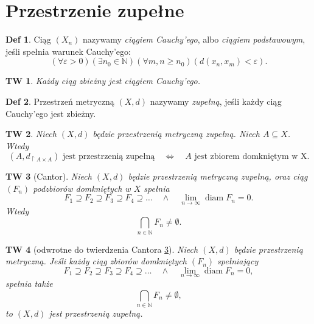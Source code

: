 \documentclass[a4paper, 12pt]{mwart}
\DeclareMathOperator{\diam}{diam}
\theoremstyle{definition}
\newtheorem{definicja}{Def}[section]
\theoremstyle{plain}
\newtheorem{twierdzenie}{TW}[section]
\theoremstyle{remark}
\begin{document}
\section{Przestrzenie zupełne}
\begin{definicja}
	Ciąg $(X_n)$ nazywamy \emph {ciągiem Cauchy'ego}, albo \emph{ciągiem podstawowym}, jeśli spełnia warunek Cauchy'ego:
	\begin{equation}
		\left(\forall \varepsilon > 0\right)\left(\exists n_0 \in \mathbb{N}\right)\left(\forall m, n \geq n_0\right)\left(d(x_n, x_m) < \varepsilon\right).
	\end{equation}
\end{definicja}
\begin{twierdzenie}
	Każdy ciąg zbieżny jest ciągiem Cauchy'ego.
\end{twierdzenie}
\begin{definicja}
	Przestrzeń metryczną $(X, d)$ nazywamy \emph{zupełną}, jeśli każdy ciąg Cauchy'ego jest zbieżny.
\end{definicja}
\begin{twierdzenie}
	Niech $(X, d)$ będzie przestrzenią metryczną zupełną. Niech $A \subseteq X$. Wtedy
	\begin{equation}
		(A, d_{\restriction A\times A}) \text{ jest przestrzenią zupełną} \quad \iff \quad A \text{ jest zbiorem domkniętym w X}.
	\end{equation}
\end{twierdzenie}
\begin{twierdzenie}[Cantor] \label{cantor}
	Niech $(X, d)$ będzie przestrzenią metryczną zupełną, oraz ciąg $(F_n)$ podzbiorów domkniętych w $X$ spełnia
	\begin{equation}
		F_1 \supseteq F_2 \supseteq F_3 \supseteq F_4 \supseteq \ldots \quad \land \quad \lim_{n \to \infty} \diam F_n = 0.
	\end{equation}
	Wtedy
	\begin{equation}
		\bigcap_{n \in \mathbb{N}} F_n \neq \emptyset.
	\end{equation}
\end{twierdzenie}
\begin{twierdzenie}[odwrotne do twierdzenia Cantora \ref{cantor}]
	Niech $(X, d)$ będzie przestrzenią metryczną. Jeśli każdy ciąg zbiorów domkniętych $(F_n)$ spełniający
	\begin{equation}
		F_1 \supseteq F_2 \supseteq F_3 \supseteq F_4 \supseteq \ldots \quad \land \quad \lim_{n \to \infty} \diam F_n = 0,
	\end{equation}
	spełnia także
	\begin{equation}
		\bigcap_{n \in \mathbb{N}} F_n \neq \emptyset,
	\end{equation}
	to $(X, d)$ jest przestrzenią zupełną.
\end{twierdzenie}
\end{document}
